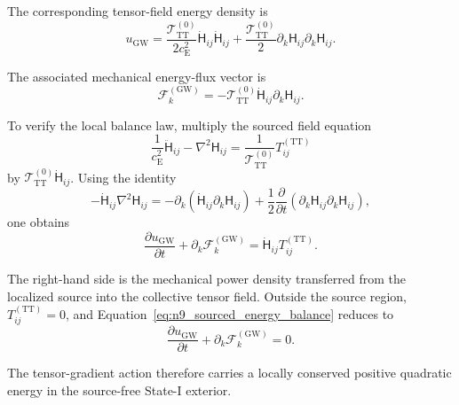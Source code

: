 The corresponding tensor-field energy density is
\begin{equation}
    u_{\mathrm{GW}} = \frac{ \mathcal{T}_{\mathrm{TT}}^{(0)} }{ 2c_{\mathrm{E}}^{2} } \dot{\mathsf{H}}_{ij} \dot{\mathsf{H}}_{ij} + \frac{ \mathcal{T}_{\mathrm{TT}}^{(0)} }{2} \partial_{k}\mathsf{H}_{ij} \partial_{k}\mathsf{H}_{ij}.
    \label{eq:n9_tensor_energy_density}
\end{equation}

The associated mechanical energy-flux vector is
\begin{equation}
    \mathcal{F}_{k}^{(\mathrm{GW})} = - \mathcal{T}_{\mathrm{TT}}^{(0)} \dot{\mathsf{H}}_{ij} \partial_{k}\mathsf{H}_{ij}.
    \label{eq:n9_tensor_energy_flux_vector}
\end{equation}

To verify the local balance law, multiply the sourced field equation
\begin{equation}
    \frac{1}{c_{\mathrm{E}}^{2}} \ddot{\mathsf{H}}_{ij} - \nabla^{2}\mathsf{H}_{ij} = \frac{1}{ \mathcal{T}_{\mathrm{TT}}^{(0)} } T_{ij}^{(\mathrm{TT})}
\end{equation}
by $\mathcal{T}_{\mathrm{TT}}^{(0)} \dot{\mathsf{H}}_{ij}$. Using the identity
\begin{equation}
    - \dot{\mathsf{H}}_{ij} \nabla^{2}\mathsf{H}_{ij} = - \partial_{k} \left( \dot{\mathsf{H}}_{ij} \partial_{k}\mathsf{H}_{ij} \right) + \frac{1}{2} \frac{\partial}{\partial t} \left( \partial_{k}\mathsf{H}_{ij} \partial_{k}\mathsf{H}_{ij} \right),
\end{equation}
one obtains
\begin{equation}
    \frac{\partial u_{\mathrm{GW}}}{\partial t} + \partial_{k} \mathcal{F}_{k}^{(\mathrm{GW})} = \dot{\mathsf{H}}_{ij} T_{ij}^{(\mathrm{TT})}.
    \label{eq:n9_sourced_energy_balance}
\end{equation}

The right-hand side is the mechanical power density transferred from the localized source into the collective tensor field. Outside the source region, $T_{ij}^{(\mathrm{TT})} = 0$, and Equation~\eqref{eq:n9_sourced_energy_balance} reduces to
\begin{equation}
    \frac{\partial u_{\mathrm{GW}}}{\partial t} + \partial_{k} \mathcal{F}_{k}^{(\mathrm{GW})} = 0.
    \label{eq:n9_source_free_energy_conservation}
\end{equation}

The tensor-gradient action therefore carries a locally conserved positive quadratic energy in the source-free State-I exterior.

